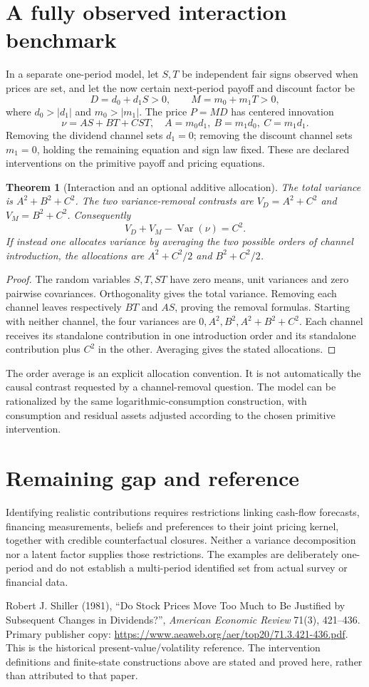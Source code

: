 \documentclass[11pt,a4paper]{article}
\newtheorem{theorem}{Theorem}[section]
\theoremstyle{definition}
\theoremstyle{remark}
\DeclareMathOperator{\Var}{Var}
\begin{document}
\section{A fully observed interaction benchmark}
In a separate one-period model, let $S,T$ be independent fair signs observed when prices are set, and let the now certain next-period payoff and discount factor be
\[
 D=d_0+d_1S>0,\qquad M=m_0+m_1T>0,
\]
where $d_0>|d_1|$ and $m_0>|m_1|$. The price $P=MD$ has centered innovation
\[
 \nu=A S+B T+C ST,\quad A=m_0d_1,\ B=m_1d_0,\ C=m_1d_1.
\]
Removing the dividend channel sets $d_1=0$; removing the discount channel sets $m_1=0$, holding the remaining equation and sign law fixed. These are declared interventions on the primitive payoff and pricing equations.

\begin{theorem}[Interaction and an optional additive allocation]
The total variance is $A^2+B^2+C^2$. The two variance-removal contrasts are $V_D=A^2+C^2$ and $V_M=B^2+C^2$. Consequently
\[
 V_D+V_M-\Var(\nu)=C^2.
\]
If instead one allocates variance by averaging the two possible orders of channel introduction, the allocations are $A^2+C^2/2$ and $B^2+C^2/2$.
\end{theorem}
\begin{proof}
The random variables $S,T,ST$ have zero means, unit variances and zero pairwise covariances. Orthogonality gives the total variance. Removing each channel leaves respectively $BT$ and $AS$, proving the removal formulas. Starting with neither channel, the four variances are $0,A^2,B^2,A^2+B^2+C^2$. Each channel receives its standalone contribution in one introduction order and its standalone contribution plus $C^2$ in the other. Averaging gives the stated allocations.
\end{proof}

The order average is an explicit allocation convention. It is not automatically the causal contrast requested by a channel-removal question. The model can be rationalized by the same logarithmic-consumption construction, with consumption and residual assets adjusted according to the chosen primitive intervention.

\section{Remaining gap and reference}
Identifying realistic contributions requires restrictions linking cash-flow forecasts, financing measurements, beliefs and preferences to their joint pricing kernel, together with credible counterfactual closures. Neither a variance decomposition nor a latent factor supplies those restrictions. The examples are deliberately one-period and do not establish a multi-period identified set from actual survey or financial data.

Robert J. Shiller (1981), ``Do Stock Prices Move Too Much to Be Justified by Subsequent Changes in Dividends?'', \emph{American Economic Review} 71(3), 421--436. Primary publisher copy: \url{https://www.aeaweb.org/aer/top20/71.3.421-436.pdf}. This is the historical present-value/volatility reference. The intervention definitions and finite-state constructions above are stated and proved here, rather than attributed to that paper.
\end{document}
